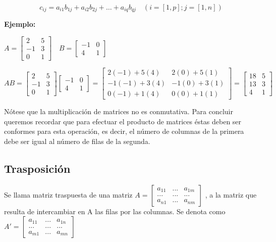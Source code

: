$$ c_{ij} = a_{i1}b_{1j} + a_{i2}b_{2j} + \dots + a_{iq}b_{qj} \quad  (i=[1,p] ; j=[1,n]) $$

\textbf{Ejemplo:}

$ A =\begin{bmatrix} 2  & 5  \\ -1  & 3 \\ 0 & 1 \end{bmatrix} \quad B =\begin{bmatrix} -1  & 0  \\ 4  &  1 \end{bmatrix} $

$$ AB= \begin{bmatrix} 2  & 5  \\ -1  & 3 \\ 0 & 1 \end{bmatrix} \begin{bmatrix} -1  & 0  \\ 4  &  1 \end{bmatrix} = \begin{bmatrix} 2(-1)+ 5(4)  & 2(0)+ 5(1) \\ -1(-1)+3(4)  & -1(0)+3(1) \\ 0(-1)+1(4) & 0(0) + 1(1) \end{bmatrix}  = \begin{bmatrix} 18  & 5  \\ 13  & 3 \\ 4 & 1 \end{bmatrix} $$

Nótese que la multiplicación de matrices no es conmutativa.
Para concluir queremos recordar que para efectuar el producto de matrices éstas deben ser
conformes para esta operación, es decir, el número de columnas de la primera debe ser igual
al número de filas de la segunda.

\subsection{Trasposición}

Se llama matriz traspuesta de una matriz $A=\begin{bmatrix} a_{11}  & ... & a_{1m} \\ ... & ... & ... \\ a_{n1}  & ... & a_{nm} \end{bmatrix} $ , a la matriz que resulta de intercambiar en A las
filas por las columnas. Se denota como$A'=\begin{bmatrix} a_{11}  & ... & a_{1n} \\ ... & ... & ... \\ a_{m1}  & ... & a_{mn} \end{bmatrix} $

